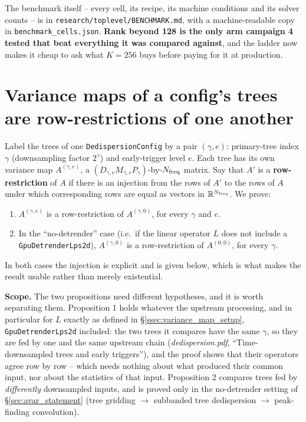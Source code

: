 \documentclass{article}
\numberwithin{equation}{section}   %
\newcommand{\ddnotes}[1]{{\em dedispersion.pdf}, ``#1''}
\begin{document}
\par\noindent
The benchmark itself -- every cell, its recipe, its machine conditions and its solver counts --
is in {\tt research/toplevel/BENCHMARK.md}, with a machine-readable copy in
{\tt benchmark\_cells.json}. {\bf Rank beyond 128 is the only arm campaign 4 tested that beat
everything it was compared against}, and the ladder now makes it cheap to ask what $K = 256$
buys before paying for it at production.

\clearpage

\appendix

\section{Variance maps of a config's trees are row-restrictions of one another}
\label{sec:tree_restrictions}

Label the trees of one {\tt DedispersionConfig} by a pair $(\gamma, e)$: primary-tree index
$\gamma$ (downsampling factor $2^\gamma$) and early-trigger level $e$. Each tree has its own
variance map $A^{(\gamma,e)}$, a $(D_{\gamma,e} M_{\gamma,e} P_\gamma)$-by-$N_{\rm freq}$
matrix. Say that $A'$ is a {\bf row-restriction} of $A$ if there is an injection from the rows
of $A'$ to the rows of $A$ under which corresponding rows are equal as vectors in
$\mathbb{R}^{N_{\rm freq}}$. We prove:
\begin{enumerate}
\item $A^{(\gamma,e)}$ is a row-restriction of $A^{(\gamma,0)}$, for every $\gamma$ and $e$.
\item In the ``no-detrender'' case (i.e.\ if the linear operator $L$ does not include a
 {\tt GpuDetrenderLps2d}), $A^{(\gamma,0)}$ is a row-restriction of $A^{(0,0)}$, for every $\gamma$.
\end{enumerate}
In both cases the injection is explicit and is given below, which is what makes the result
usable rather than merely existential.

\medskip
\par\noindent
{\bf Scope.} The two propositions need different hypotheses, and it is worth separating them.
Proposition 1 holds whatever the upstream processing, and in particular for $L$
exactly as defined in \S\ref{ssec:variance_map_setup}, {\tt GpuDetrenderLps2d} included: the two
trees it compares have the same $\gamma$, so they are fed by one and the same upstream chain
(\ddnotes{Time-downsampled trees and early triggers}), and the proof shows that their
operators agree row by row -- which needs nothing about what produced their common input, nor
about the statistics of that input. Proposition 2 compares trees fed by {\em differently}
downsampled inputs, and is proved only in the no-detrender setting of
\S\ref{sec:avar_statement} (tree gridding $\to$ subbanded tree dedispersion $\to$ peak-finding
convolution).
\end{document}
